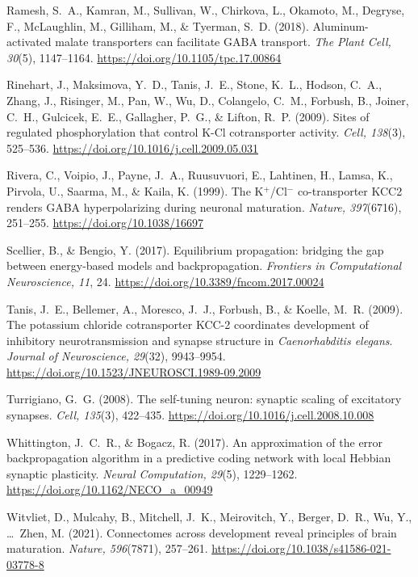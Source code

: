 \documentclass[11pt,a4paper]{article}
\newenvironment{apabib}{\raggedright\begin{list}{}{%
  \setlength{\leftmargin}{1.6em}\setlength{\itemindent}{-1.6em}%
  \setlength{\itemsep}{3pt}\setlength{\parsep}{0pt}\setlength{\topsep}{4pt}}}%
  {\end{list}}
\begin{document}
\begin{apabib}
\item Ramesh, S.~A., Kamran, M., Sullivan, W., Chirkova, L., Okamoto, M., Degryse, F., McLaughlin, M., Gilliham, M., \& Tyerman, S.~D. (2018). Aluminum-activated malate transporters can facilitate GABA transport. \emph{The Plant Cell, 30}(5), 1147--1164. \url{https://doi.org/10.1105/tpc.17.00864}
\item Rinehart, J., Maksimova, Y.~D., Tanis, J.~E., Stone, K.~L., Hodson, C.~A., Zhang, J., Risinger, M., Pan, W., Wu, D., Colangelo, C.~M., Forbush, B., Joiner, C.~H., Gulcicek, E.~E., Gallagher, P.~G., \& Lifton, R.~P. (2009). Sites of regulated phosphorylation that control K-Cl cotransporter activity. \emph{Cell, 138}(3), 525--536. \url{https://doi.org/10.1016/j.cell.2009.05.031}
\item Rivera, C., Voipio, J., Payne, J.~A., Ruusuvuori, E., Lahtinen, H., Lamsa, K., Pirvola, U., Saarma, M., \& Kaila, K. (1999). The K$^{+}$/Cl$^{-}$ co-transporter KCC2 renders GABA hyperpolarizing during neuronal maturation. \emph{Nature, 397}(6716), 251--255. \url{https://doi.org/10.1038/16697}
\item Scellier, B., \& Bengio, Y. (2017). Equilibrium propagation: bridging the gap between energy-based models and backpropagation. \emph{Frontiers in Computational Neuroscience, 11}, 24. \url{https://doi.org/10.3389/fncom.2017.00024}
\item Tanis, J.~E., Bellemer, A., Moresco, J.~J., Forbush, B., \& Koelle, M.~R. (2009). The potassium chloride cotransporter KCC-2 coordinates development of inhibitory neurotransmission and synapse structure in \emph{Caenorhabditis elegans}. \emph{Journal of Neuroscience, 29}(32), 9943--9954. \url{https://doi.org/10.1523/JNEUROSCI.1989-09.2009}
\item Turrigiano, G.~G. (2008). The self-tuning neuron: synaptic scaling of excitatory synapses. \emph{Cell, 135}(3), 422--435. \url{https://doi.org/10.1016/j.cell.2008.10.008}
\item Whittington, J.~C.~R., \& Bogacz, R. (2017). An approximation of the error backpropagation algorithm in a predictive coding network with local Hebbian synaptic plasticity. \emph{Neural Computation, 29}(5), 1229--1262. \url{https://doi.org/10.1162/NECO\_a\_00949}
\item Witvliet, D., Mulcahy, B., Mitchell, J.~K., Meirovitch, Y., Berger, D.~R., Wu, Y., \ldots\ Zhen, M. (2021). Connectomes across development reveal principles of brain maturation. \emph{Nature, 596}(7871), 257--261. \url{https://doi.org/10.1038/s41586-021-03778-8}
\end{apabib}
\end{document}
